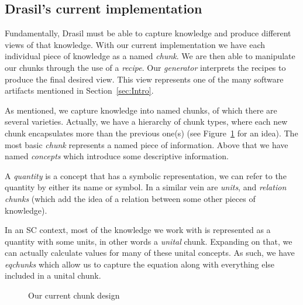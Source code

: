 \documentclass[preprint, 10pt]{sigplanconf}
\begin{document}
\subsection{Drasil's current implementation}
\label{subsec:current}

Fundamentally, Drasil must be able to capture knowledge and produce different
views of that knowledge. With our current implementation we have each individual
piece of knowledge as a named \emph{chunk}. We are then able to manipulate our
chunks through the use of a \emph{recipe}. Our \emph{generator} interprets the
recipes to produce the final desired view. This view represents one of the many
software artifacts mentioned in Section~\ref{sec:Intro}.

As mentioned, we capture knowledge into named chunks, of which there
are several varieties. Actually, we have a hierarchy of chunk types, where each
new chunk encapsulates more than the previous one(s) (see
Figure~\ref{fig:chunks} for an idea). The most basic \emph{chunk} represents a
named piece of information. Above that we have named \emph{concepts} which
introduce some descriptive information.

A \emph{quantity} is a concept that has a symbolic representation, we can refer
to the quantity by either its name or symbol. In a similar vein are
\emph{units}, %
and \emph{relation chunks} (which add the idea of a
relation between some other pieces of knowledge).

In an SC context, most of the knowledge we work with is represented as a
quantity with some units, in other words a \emph{unital} chunk. Expanding on
that, we can actually calculate values for many of these unital concepts. As
such, we have \emph{eqchunks} which allow us to capture the equation along with
everything else included in a unital chunk.

\begin{figure}
\begin{center}
\end{center}
\caption{Our current chunk design}
\label{fig:chunks}
\end{figure}
\end{document}
